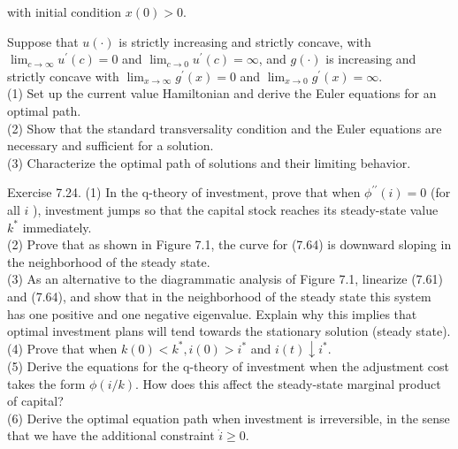 \documentclass[\topdir/lecture_notes.tex]{subfiles}
\begin{document}
with initial condition $x(0)>0$.

Suppose that $u(\cdot)$ is strictly increasing and strictly concave, with $\lim _{c \rightarrow \infty} u^{\prime}(c)=0$ and $\lim _{c \rightarrow 0} u^{\prime}(c)=\infty$, and $g(\cdot)$ is increasing and strictly concave with $\lim _{x \rightarrow \infty} g^{\prime}(x)=0$ and $\lim _{x \rightarrow 0} g^{\prime}(x)=\infty$.\\
(1) Set up the current value Hamiltonian and derive the Euler equations for an optimal path.\\
(2) Show that the standard transversality condition and the Euler equations are necessary and sufficient for a solution.\\
(3) Characterize the optimal path of solutions and their limiting behavior.

Exercise 7.24. (1) In the q-theory of investment, prove that when $\phi^{\prime \prime}(i)=0$ (for all $i$ ), investment jumps so that the capital stock reaches its steady-state value $k^{*}$ immediately.\\
(2) Prove that as shown in Figure 7.1, the curve for (7.64) is downward sloping in the neighborhood of the steady state.\\
(3) As an alternative to the diagrammatic analysis of Figure 7.1, linearize (7.61) and (7.64), and show that in the neighborhood of the steady state this system has one positive and one negative eigenvalue. Explain why this implies that optimal investment plans will tend towards the stationary solution (steady state).\\
(4) Prove that when $k(0)<k^{*}, i(0)>i^{*}$ and $i(t) \downarrow i^{*}$.\\
(5) Derive the equations for the q-theory of investment when the adjustment cost takes the form $\phi(i / k)$. How does this affect the steady-state marginal product of capital?\\
(6) Derive the optimal equation path when investment is irreversible, in the sense that we have the additional constraint $\dot{i} \geq 0$.
\end{document}
